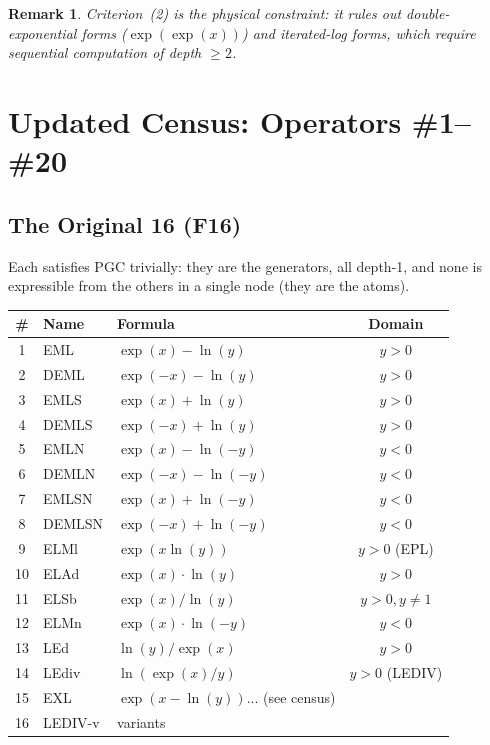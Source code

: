\documentclass[11pt]{article}
\newtheorem{remark}[theorem]{Remark}
\begin{document}
\begin{remark}
Criterion~(2) is the physical constraint: it rules out double-exponential
forms ($\exp(\exp(x))$) and iterated-log forms, which require sequential
computation of depth $\geq 2$.
\end{remark}

\section{Updated Census: Operators \#1--\#20}
\label{sec:census}

\subsection{The Original 16 (F16)}

Each satisfies PGC trivially: they are the generators, all depth-1, and
none is expressible from the others in a single node (they are the atoms).

\begin{center}
\small
\begin{tabular}{cllc}
\toprule
\# & Name & Formula & Domain \\
\midrule
1  & EML   & $\exp(x) - \ln(y)$       & $y>0$ \\
2  & DEML  & $\exp(-x) - \ln(y)$      & $y>0$ \\
3  & EMLS  & $\exp(x) + \ln(y)$       & $y>0$ \\
4  & DEMLS & $\exp(-x) + \ln(y)$      & $y>0$ \\
5  & EMLN  & $\exp(x) - \ln(-y)$      & $y<0$ \\
6  & DEMLN & $\exp(-x) - \ln(-y)$     & $y<0$ \\
7  & EMLSN & $\exp(x) + \ln(-y)$      & $y<0$ \\
8  & DEMLSN& $\exp(-x) + \ln(-y)$     & $y<0$ \\
9  & ELMl  & $\exp(x \ln(y))$         & $y>0$ (EPL) \\
10 & ELAd  & $\exp(x) \cdot \ln(y)$   & $y>0$ \\
11 & ELSb  & $\exp(x) / \ln(y)$       & $y>0, y\neq 1$ \\
12 & ELMn  & $\exp(x) \cdot \ln(-y)$  & $y<0$ \\
13 & LEd   & $\ln(y) / \exp(x)$       & $y>0$ \\
14 & LEdiv & $\ln(\exp(x)/y)$         & $y>0$ (LEDIV) \\
15 & EXL   & $\exp(x-\ln(y))$... (see census) & \\
16 & LEDIV-v& variants               & \\
\bottomrule
\end{tabular}
\end{center}
\end{document}
